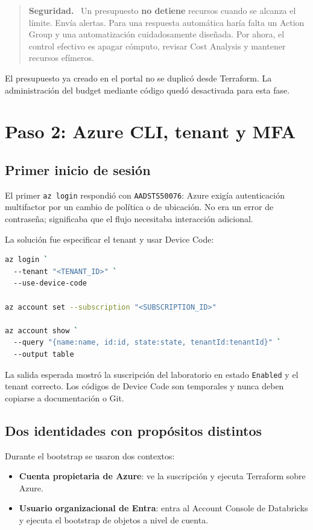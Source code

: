 \documentclass[11pt,a4paper]{article}
\newenvironment{seguridad}{
  \begin{quote}\color{dborange}\textbf{Seguridad.}\ }{
  \end{quote}}
\begin{document}
\begin{seguridad}
Un presupuesto \textbf{no detiene} recursos cuando se alcanza el límite. Envía alertas. Para una
respuesta automática haría falta un Action Group y una automatización cuidadosamente diseñada.
Por ahora, el control efectivo es apagar cómputo, revisar Cost Analysis y mantener recursos
efímeros.
\end{seguridad}

El presupuesto ya creado en el portal no se duplicó desde Terraform. La administración del budget
mediante código quedó desactivada para esta fase.

\section{Paso 2: Azure CLI, tenant y MFA}

\subsection{Primer inicio de sesión}

El primer \texttt{az login} respondió con \texttt{AADSTS50076}: Azure exigía autenticación
multifactor por un cambio de política o de ubicación. No era un error de contraseña; significaba
que el flujo necesitaba interacción adicional.

La solución fue especificar el tenant y usar Device Code:

\begin{lstlisting}[language=bash]
az login `
  --tenant "<TENANT_ID>" `
  --use-device-code

az account set --subscription "<SUBSCRIPTION_ID>"

az account show `
  --query "{name:name, id:id, state:state, tenantId:tenantId}" `
  --output table
\end{lstlisting}

La salida esperada mostró la suscripción del laboratorio en estado \texttt{Enabled} y el tenant
correcto. Los códigos de Device Code son temporales y nunca deben copiarse a documentación o Git.

\subsection{Dos identidades con propósitos distintos}

Durante el bootstrap se usaron dos contextos:

\begin{itemize}
  \item \textbf{Cuenta propietaria de Azure}: ve la suscripción y ejecuta Terraform sobre Azure.
  \item \textbf{Usuario organizacional de Entra}: entra al Account Console de Databricks y ejecuta
  el bootstrap de objetos a nivel de cuenta.
\end{itemize}
\end{document}

